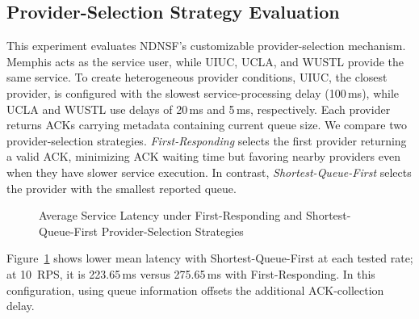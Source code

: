 \subsection{Provider-Selection Strategy Evaluation}
\label{sec:custom-selection}

This experiment evaluates NDNSF's customizable provider-selection mechanism. Memphis acts as the service user, while UIUC, UCLA, and WUSTL provide the same service. To create heterogeneous provider conditions, UIUC, the closest provider, is configured with the slowest service-processing delay (100\,ms), while UCLA and WUSTL use delays of 20\,ms and 5\,ms, respectively. Each provider returns ACKs carrying metadata containing current queue size. We compare two provider-selection strategies. \emph{First-Responding} selects the first provider returning a valid ACK, minimizing ACK waiting time but favoring nearby providers even when they have slower service execution. In contrast, \emph{Shortest-Queue-First}  selects the provider with the smallest reported queue.

\begin{figure}[!hb]
  \centering
  \caption{Average Service Latency under First-Responding and Shortest-Queue-First Provider-Selection Strategies}
  \label{fig:custom-selection-avg-latency}
\end{figure}

Figure~\ref{fig:custom-selection-avg-latency} shows lower mean latency with Shortest-Queue-First at each tested rate; at 10~RPS, it is 223.65\,ms versus 275.65\,ms with First-Responding. In this configuration, using queue information offsets the additional ACK-collection delay.

